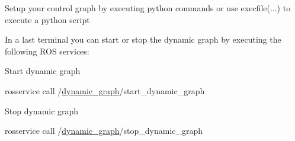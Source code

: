 \begin{DoxyEnumerate}
\begin{DoxyEnumerate}
\item Setup your control graph by executing python commands or use {\ttfamily execfile(...)} to execute a python script
\end{DoxyEnumerate}
\item In a last terminal you can start or stop the dynamic graph by executing the following R\+OS services\+:
\begin{DoxyEnumerate}
\item Start dynamic graph 
\begin{DoxyCode}
rosservice call /\hyperlink{namespacedynamic__graph}{dynamic\_graph}/start\_dynamic\_graph
\end{DoxyCode}

\item Stop dynamic graph 
\begin{DoxyCode}
rosservice call /\hyperlink{namespacedynamic__graph}{dynamic\_graph}/stop\_dynamic\_graph
\end{DoxyCode}
 
\end{DoxyEnumerate}
\end{DoxyEnumerate}